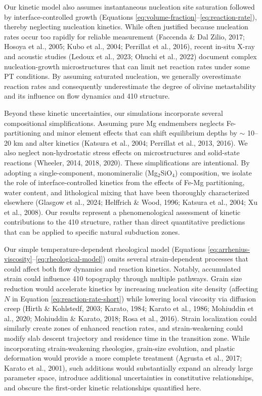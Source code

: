 \documentclass[draft,linenumbers]{agujournal2019}
\begin{document}
Our kinetic model also assumes instantaneous nucleation site saturation
followed by interface-controlled growth (Equations
\ref{eq:volume-fraction}--\ref{eq:reaction-rate}), thereby neglecting
nucleation kinetics. While often justified because nucleation rates
occur too rapidly for reliable measurement (Faccenda \& Dal Zilio, 2017;
Hosoya et al., 2005; Kubo et al., 2004; Perrillat et al., 2016), recent
in-situ X-ray and acoustic studies ({Ledoux et al.}, 2023; Ohuchi et
al., 2022) document complex nucleation-growth microstructures that can
limit net reaction rates under some PT conditions. By assuming saturated
nucleation, we generally overestimate reaction rates and consequently
underestimate the degree of olivine metastability and its influence on
flow dynamics and 410 structure.

Beyond these kinetic uncertainties, our simulations incorporate several
compositional simplifications. Assuming pure Mg endmembers neglects
Fe-partitioning and minor element effects that can shift equilibrium
depths by \(\sim\) 10--20 km and alter kinetics ({Katsura et al.}, 2004;
Perrillat et al., 2013, 2016). We also neglect non-hydrostatic stress
effects on microstructures and solid-state reactions (Wheeler, 2014,
2018, 2020). These simplifications are intentional. By adopting a
single-component, monomineralic (Mg\(_2\)SiO\(_4\)) composition, we
isolate the role of interface-controlled kinetics from the effects of
Fe-Mg partitioning, water content, and lithological mixing that have
been thoroughly characterized elsewhere (Glasgow et al., 2024; Helffrich
\& Wood, 1996; {Katsura et al.}, 2004; Xu et al., 2008). Our results
represent a phenomenological assessment of kinetic contributions to the
410 structure, rather than direct quantitative predictions that can be
applied to specific natural subduction zones.

Our simple temperature-dependent rheological model (Equations
\ref{eq:arrhenius-viscosity}--\ref{eq:rheological-model}) omits several
strain-dependent processes that could affect both flow dynamics and
reaction kinetics. Notably, accumulated strain could influence 410
topography through multiple pathways. Grain size reduction would
accelerate kinetics by increasing nucleation site density (affecting
\(N\) in Equation \ref{eq:reaction-rate-short}) while lowering local
viscosity via diffusion creep (Hirth \& Kohlstedf, 2003; Karato, 1984;
Karato et al., 1986; Mohiuddin et al., 2020; Mohiuddin \& Karato, 2018;
Rosa et al., 2016). Strain localization could similarly create zones of
enhanced reaction rates, and strain-weakening could modify slab descent
trajectory and residence time in the transition zone. While
incorporating strain-weakening rheologies, grain-size evolution, and
plastic deformation would provide a more complete treatment (Agrusta et
al., 2017; Karato et al., 2001), such additions would substantially
expand an already large parameter space, introduce additional
uncertainties in constitutive relationships, and obscure the first-order
kinetic relationships quantified here.
\end{document}
